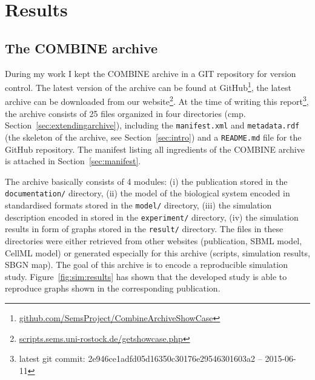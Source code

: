 
\section{Results}

\subsection{The COMBINE archive}
During my work I kept the COMBINE archive in a GIT repository for version control.
The latest version of the archive can be found at GitHub\footnote{\href{https://github.com/SemsProject/CombineArchiveShowCase}{github.com/SemsProject/CombineArchiveShowCase}}, the latest archive can be downloaded from our website\footnote{\href{http://scripts.sems.uni-rostock.de/getshowcase.php}{scripts.sems.uni-rostock.de/getshowcase.php}}.
At the time of writing this report\footnote{latest git commit: 2e946ce1adfd05d16350c30176e29546301603a2 -- 2015-06-11}, the archive consists of 25 files organized in four directories (cmp. Section~\ref{sec:extendingarchive}), including the \texttt{manifest.xml} and \texttt{metadata.rdf} (the skeleton of the archive, see Section~\ref{sec:intro}) and a \texttt{README.md} file for the GitHub repository.
The manifest listing all ingredients of the COMBINE archive is attached in Section~\ref{sec:manifest}.

The archive basically consists of 4 modules: (i) the publication stored in the \texttt{documentation/} directory, (ii) the model of the biological system encoded in standardised formats stored in the \texttt{model/} directory, (iii) the simulation description encoded in \sedml stored in the \texttt{experiment/} directory, (iv) the simulation results in form of graphs stored in the \texttt{result/} directory.
The files in these directories were either retrieved from other websites (publication, SBML model, CellML model) or generated especially for this archive (\sedml scripts, simulation results, SBGN map).
The goal of this archive is to encode a reproducible simulation study.
Figure~\ref{fig:sim:results} has shown that the developed study is able to reproduce graphs shown in the corresponding publication.







